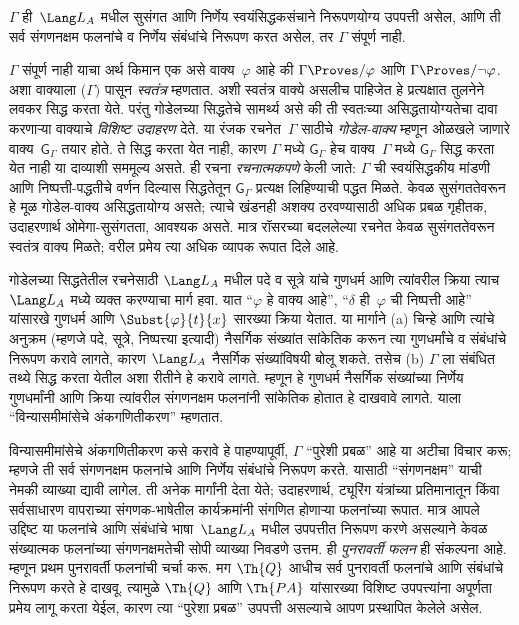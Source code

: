 \begin{thm}
$\Gamma$ ही~$\Lang
L_A$ मधील सुसंगत आणि निर्णेय स्वयंसिद्धकसंचाने निरूपणयोग्य उपपत्ती असेल, आणि ती सर्व
संगणनक्षम फलनांचे व निर्णेय संबंधांचे निरूपण करत असेल,
तर $\Gamma$ संपूर्ण नाही.
\end{thm}

$\Gamma$ संपूर्ण नाही याचा अर्थ किमान एक असे
वाक्य~$\varphi$ आहे की $\Gamma \Proves/ \varphi$ आणि
$\Gamma \Proves/ \lnot
\varphi$. अशा वाक्याला ($\Gamma)$ पासून \emph{स्वतंत्र}
म्हणतात. अशी स्वतंत्र वाक्ये असलीच पाहिजेत हे प्रत्यक्षात तुलनेने
लवकर सिद्ध करता येते. परंतु गोडेलच्या सिद्धतेचे सामर्थ्य असे की
ती स्वतःच्या असिद्धतायोग्यतेचा दावा करणाऱ्या वाक्याचे
\emph{विशिष्ट उदाहरण} देते.
या रंजक रचनेत~$\Gamma$ साठीचे \emph{गोडेल-वाक्य} म्हणून ओळखले
जाणारे वाक्य~$\mathsf{G}_\Gamma$ तयार होते. ते सिद्ध करता येत
नाही, कारण $\Gamma$ मध्ये $\mathsf{G}_\Gamma$ हेच वाक्य~$\Gamma$ मध्ये
$\mathsf{G}_\Gamma$ सिद्ध करता येत नाही या दाव्याशी सममूल्य असते.
ही रचना \emph{रचनात्मकपणे} केली जाते: $\Gamma$ ची स्वयंसिद्धकीय
मांडणी आणि निष्पत्ती-पद्धतीचे वर्णन दिल्यास सिद्धतेतून
$\mathsf{G}_\Gamma$ प्रत्यक्ष लिहिण्याची पद्धत मिळते. केवळ सुसंगततेवरून हे मूळ गोडेल-वाक्य
असिद्धतायोग्य असते; त्याचे खंडनही अशक्य ठरवण्यासाठी अधिक प्रबळ
गृहीतक, उदाहरणार्थ ओमेगा-सुसंगतता, आवश्यक असते. मात्र रॉसरच्या
बदललेल्या रचनेत केवळ सुसंगततेवरून स्वतंत्र वाक्य मिळते; वरील
प्रमेय त्या अधिक व्यापक रूपात दिले आहे.


गोडेलच्या सिद्धतेतील रचनेसाठी $\Lang L_A$ मधील पदे व
सूत्रे यांचे गुणधर्म आणि त्यांवरील क्रिया त्याच $\Lang L_A$
मध्ये व्यक्त करण्याचा मार्ग हवा. यात ``$\varphi$ हे वाक्य आहे'',
``$\delta$ ही~$\varphi$ ची निष्पत्ती आहे'' यांसारखे गुणधर्म
आणि $\Subst{\varphi}{t}{x}$ सारख्या क्रिया येतात. या मार्गाने
(a) चिन्हे आणि त्यांचे अनुक्रम (म्हणजे पदे, सूत्रे,
निष्पत्त्या इत्यादी) नैसर्गिक संख्यांत सांकेतिक करून
त्या गुणधर्मांचे व संबंधांचे निरूपण करावे लागते, कारण $\Lang L_A$
नैसर्गिक संख्यांविषयी बोलू शकते. तसेच (b) $\Gamma$ ला संबंधित
तथ्ये सिद्ध करता येतील अशा रीतीने हे करावे लागते. म्हणून हे
गुणधर्म नैसर्गिक संख्यांच्या निर्णेय गुणधर्मांनी आणि क्रिया
त्यांवरील संगणनक्षम फलनांनी सांकेतिक होतात हे दाखवावे लागते.
याला ``विन्यासमीमांसेचे अंकगणितीकरण'' म्हणतात.

विन्यासमीमांसेचे अंकगणितीकरण कसे करावे हे पाहण्यापूर्वी, $\Gamma$
``पुरेशी प्रबळ'' आहे या अटीचा विचार करू; म्हणजे ती सर्व संगणनक्षम
फलनांचे आणि निर्णेय संबंधांचे निरूपण करते. यासाठी
``संगणनक्षम'' याची नेमकी व्याख्या द्यावी लागेल. ती अनेक मार्गांनी
देता येते; उदाहरणार्थ, ट्यूरिंग यंत्रांच्या प्रतिमानातून किंवा
सर्वसाधारण वापराच्या संगणक-भाषेतील कार्यक्रमांनी संगणित होणाऱ्या
फलनांच्या रूपात. मात्र आपले उद्दिष्ट या फलनांचे आणि संबंधांचे
भाषा~$\Lang L_A$ मधील उपपत्तीत निरूपण करणे असल्याने
केवळ संख्यात्मक फलनांच्या संगणनक्षमतेची सोपी व्याख्या निवडणे
उत्तम. ही \emph{पुनरावर्ती फलन} ही संकल्पना आहे. म्हणून प्रथम
पुनरावर्ती फलनांची चर्चा करू. मग $\Th{Q}$ आधीच सर्व पुनरावर्ती
फलनांचे आणि संबंधांचे निरूपण करते हे दाखवू. त्यामुळे $\Th{Q}$
आणि $\Th{PA}$ यांसारख्या विशिष्ट उपपत्त्यांना अपूर्णता प्रमेय
लागू करता येईल, कारण त्या ``पुरेशा प्रबळ'' उपपत्ती असल्याचे
आपण प्रस्थापित केलेले असेल.

